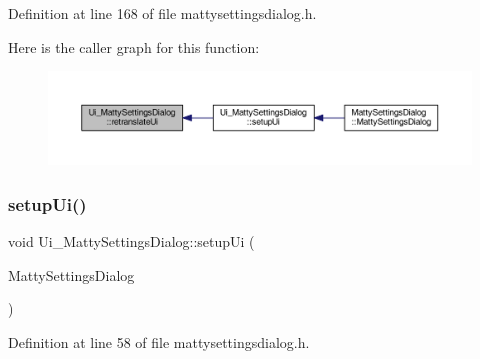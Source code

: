 Definition at line 168 of file mattysettingsdialog.\+h.

Here is the caller graph for this function\+:
\nopagebreak
\begin{figure}[H]
\begin{center}
\leavevmode
\includegraphics[width=350pt]{classUi__MattySettingsDialog_a63175c8e3ebbb59a8b60d126848a8825_icgraph}
\end{center}
\end{figure}
\hypertarget{classUi__MattySettingsDialog_ad8d03029358c22b0342ea137f6d4edb9}{}\label{classUi__MattySettingsDialog_ad8d03029358c22b0342ea137f6d4edb9} 
\subsubsection{\texorpdfstring{setup\+Ui()}{setupUi()}}
{\footnotesize\ttfamily void Ui\+\_\+\+Matty\+Settings\+Dialog\+::setup\+Ui (\begin{DoxyParamCaption}\item[{Q\+Widget $\ast$}]{Matty\+Settings\+Dialog }\end{DoxyParamCaption})\hspace{0.3cm}{\ttfamily [inline]}}



Definition at line 58 of file mattysettingsdialog.\+h.

